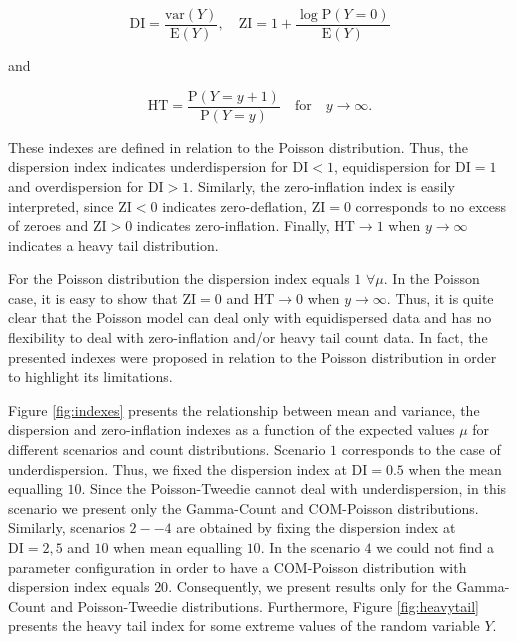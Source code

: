 \documentclass[9pt,a5paper,]{book}
\theoremstyle{definition}
\theoremstyle{definition}
\theoremstyle{remark}
\begin{document}
\begin{equation}
\mathrm{DI} = \frac{\mathrm{var}(Y)}{\mathrm{E}(Y)}, \quad
\mathrm{ZI} = 1 + \frac{\log \mathrm{P}(Y = 0)}{\mathrm{E}(Y)}
\end{equation}

and

\begin{equation}
\mathrm{HT} = \frac{\mathrm{P}(Y=y+1)}{\mathrm{P}(Y=y)}\quad \text{for} \quad y \to \infty.
\end{equation}

These indexes are defined in relation to the Poisson distribution. Thus,
the dispersion index indicates underdispersion for \(\mathrm{DI} < 1\),
equidispersion for \(\mathrm{DI} = 1\) and overdispersion for
\(\mathrm{DI} > 1\). Similarly, the zero-inflation index is easily
interpreted, since \(\mathrm{ZI} < 0\) indicates zero-deflation,
\(\mathrm{ZI} = 0\) corresponds to no excess of zeroes and
\(\mathrm{ZI} > 0\) indicates zero-inflation. Finally,
\(\mathrm{HT} \to 1\) when \(y \to \infty\) indicates a heavy tail
distribution.

For the Poisson distribution the dispersion index equals \(1\)
\(\forall \mu\). In the Poisson case, it is easy to show that
\(\mathrm{ZI} = 0\) and \(\mathrm{HT} \to 0\) when \(y \to \infty\).
Thus, it is quite clear that the Poisson model can deal only with
equidispersed data and has no flexibility to deal with zero-inflation
and/or heavy tail count data. In fact, the presented indexes were
proposed in relation to the Poisson distribution in order to highlight
its limitations.

Figure \ref{fig:indexes} presents the relationship between mean and
variance, the dispersion and zero-inflation indexes as a function of the
expected values \(\mu\) for different scenarios and count distributions.
Scenario \(1\) corresponds to the case of underdispersion. Thus, we
fixed the dispersion index at \(\mathrm{DI} = 0.5\) when the mean
equalling \(10\). Since the Poisson-Tweedie cannot deal with
underdispersion, in this scenario we present only the Gamma-Count and
COM-Poisson distributions. Similarly, scenarios \(2--4\) are obtained by
fixing the dispersion index at \(\mathrm{DI} = 2, 5\) and \(10\) when
mean equalling \(10\). In the scenario \(4\) we could not find a
parameter configuration in order to have a COM-Poisson distribution with
dispersion index equals \(20\). Consequently, we present results only
for the Gamma-Count and Poisson-Tweedie distributions. Furthermore,
Figure \ref{fig:heavytail} presents the heavy tail index for some
extreme values of the random variable \(Y\).
\end{document}
